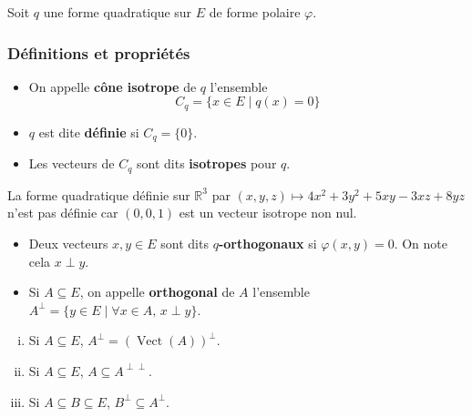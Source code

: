 	Soit $q$ une forme quadratique sur $E$ de forme polaire $\varphi$.
	
	\subsubsection{Définitions et propriétés}
	
	\begin{definition}
		\begin{itemize}
			\item On appelle \textbf{cône isotrope} de $q$ l'ensemble
			\[ C_q = \{ x \in E \mid q(x) = 0 \} \]
			\item $q$ est dite \textbf{définie} si $C_q = \{ 0 \}$.
			\item Les vecteurs de $C_q$ sont dits \textbf{isotropes} pour $q$.
		\end{itemize}
	\end{definition}
	
	
	\begin{example}
		La forme quadratique définie sur $\mathbb{R}^3$ par $(x, y, z) \mapsto 4x^2 + 3y^2 + 5xy - 3xz + 8yz$ n'est pas définie car $(0,0,1)$ est un vecteur isotrope non nul.
	\end{example}
	
	
	\begin{definition}
		\begin{itemize}
			\item Deux vecteurs $x, y \in E$ sont dits \textbf{$q$-orthogonaux} si $\varphi(x, y) = 0$. On note cela $x \perp y$.
			\item Si $A \subseteq E$, on appelle \textbf{orthogonal} de $A$ l'ensemble $A^\perp = \{ y \in E \mid \forall x \in A, \, x \perp y \}$.
		\end{itemize}
	\end{definition}
	
	\begin{proposition}
		\begin{enumerate}[(i)]
			\item Si $A \subseteq E$, $A^\perp = (\operatorname{Vect}(A))^\perp$.
			\item Si $A \subseteq E$, $A \subseteq A^{\perp\perp}$.
			\item Si $A \subseteq B \subseteq E$, $B^{\perp} \subseteq A^{\perp}$.
		\end{enumerate}
	\end{proposition}
	
